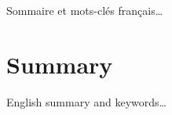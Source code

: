 \documentclass[12pt,maitrise,nobabel,anglais,twoside,initial]{template/dms}
\numberwithin{equation}{section}
\numberwithin{table}{chapter}
\numberwithin{figure}{chapter}
\begin{document}
\noindent Sommaire et mots-clés français\dots	%

\chapter*{Summary}

\noindent English summary and keywords\dots


\cleardoublepage
{}  %
\tableofcontents				%
\cleardoublepage
{}
\listoftables
\cleardoublepage
{}
\listoffigures	



\end{document}

